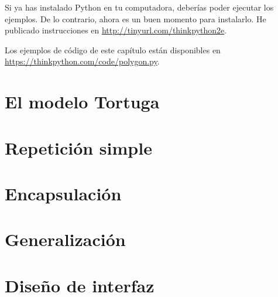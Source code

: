 \documentclass[12pt,letterpaper]{book}
\begin{document}
Si ya has instalado Python en tu computadora, deberías poder ejecutar los ejemplos. De lo contrario, ahora es un buen momento para instalarlo. He publicado instrucciones en \url{http://tinyurl.com/thinkpython2e}.

Los ejemplos de código de este capítulo están disponibles en \url{https://thinkpython.com/code/polygon.py}.

\section{El modelo Tortuga}
\section{Repetición simple}
\section{Encapsulación}
\section{Generalización}
\section{Diseño de interfaz}

\backmatter






%
%
\end{document}
